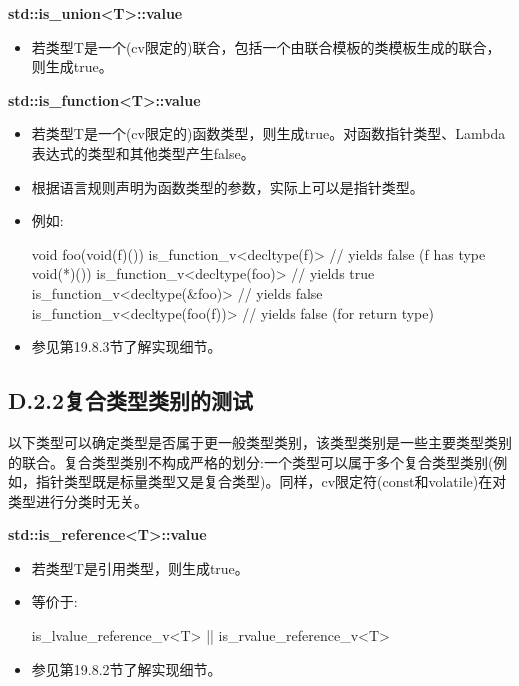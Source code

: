 \textbf{std::is\_union<T>::value}

\begin{itemize}
\item 
若类型T是一个(cv限定的)联合，包括一个由联合模板的类模板生成的联合，则生成true。
\end{itemize}

\textbf{std::is\_function<T>::value}

\begin{itemize}
\item 
若类型T是一个(cv限定的)函数类型，则生成true。对函数指针类型、Lambda表达式的类型和其他类型产生false。

\item 
根据语言规则声明为函数类型的参数，实际上可以是指针类型。

\item 
例如:
\begin{cpp}
void foo(void(f)())
{
	is_function_v<decltype(f)> // yields false (f has type void(*)())
	is_function_v<decltype(foo)> // yields true
	is_function_v<decltype(&foo)> // yields false
	is_function_v<decltype(foo(f))> // yields false (for return type)
}
\end{cpp}

\item 
参见第19.8.3节了解实现细节。
\end{itemize}

\subsection{D.2.2\hspace{0.2cm}复合类型类别的测试}

以下类型可以确定类型是否属于更一般类型类别，该类型类别是一些主要类型类别的联合。复合类型类别不构成严格的划分:一个类型可以属于多个复合类型类别(例如，指针类型既是标量类型又是复合类型)。同样，cv限定符(const和volatile)在对类型进行分类时无关。

\textbf{std::is\_reference<T>::value}

\begin{itemize}
\item 
若类型T是引用类型，则生成true。

\item 
等价于: 
\begin{cpp}
is_lvalue_reference_v<T> || is_rvalue_reference_v<T>
\end{cpp}

\item 
参见第19.8.2节了解实现细节。
\end{itemize}


